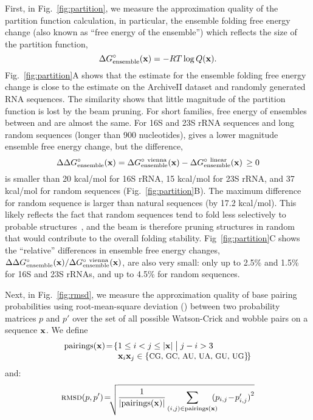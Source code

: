 First, in Fig.~\ref{fig:partition}, we measure the approximation quality of the partition function calculation,
in particular,  the ensemble folding free energy change (also known as ``free energy of the ensemble'')
which reflects the size of the partition function, 
\[
\Delta G^\circ_\text{ensemble} (\mathbf{x}) = -RT \log Q(\mathbf{x}).
\]
Fig.~\ref{fig:partition}A shows that the \linearpartition 
estimate for the ensemble folding free energy change
is close to the \rnafold estimate 
on the ArchiveII dataset and randomly generated RNA sequences.
The similarity shows that little magnitude of the partition function is lost by the beam pruning. 
For short families, free energy of ensembles between \linearpartition and \rnafold are almost the same.
For 16S and 23S rRNA sequences and long random sequences (longer than 900 nucleotides), 
\linearpartition gives a lower magnitude ensemble free energy change, 
but the difference,
\[
\Delta\Delta G^{\circ}_\text{ensemble}(\mathbf{x}) = \Delta G^{\circ\ \text{vienna}}_\text{ensemble}(\mathbf{x}) - \Delta G^{\circ\ \text{linear}}_\text{ensemble}(\mathbf{x}) \, \geq 0
\]
is smaller than 20 kcal/mol for 16S rRNA, 
15 kcal/mol for 23S rRNA,
and 37 kcal/mol for random sequences (Fig.~\ref{fig:partition}B). 
The maximum difference for random sequence is larger than natural sequences (by 17.2 kcal/mol).
This likely reflects the fact that random sequences tend to fold less selectively to probable structures~\cite{Fu+:2015},
and the beam is therefore pruning structures in random that would contribute to the overall folding stability.
Fig~\ref{fig:partition}C shows the ``relative'' differences in ensemble free energy changes,
 ${\Delta\Delta G^{\circ}_\text{ensemble}(\mathbf{x})}/{\Delta G^{\circ\ \text{vienna}}_\text{ensemble}(\mathbf{x})}$,
are also very small: only up to 2.5\% and 1.5\% for 16S and 23S rRNAs, and up to 4.5\% for random sequences.



Next, in Fig.~\ref{fig:rmsd}, we measure the approximation quality of base pairing probabilities using root-mean-square deviation (\RMSD)
between two probability matrices $p$ %
and $p'$ %
over the set of all possible Watson-Crick and wobble pairs on a sequence $\mathbf{x}$.
We  define
\begin{equation}
  \vspace{-0.4cm}
\begin{split}
  {\pairings}(\vecx) \!=\!\{  &1\leq i <j\leq |\vecx| \bigm\vert j-i>3 \\[-0.1cm]
    &  \vecx_i\vecx_j \in \{\text{\small CG, GC, AU, UA, GU, UG}\}\!\} \notag
\end{split}
\end{equation}
\vspace{-0.2cm}
and:\vspace{-0.05cm} 
\begin{equation}
\RMSD(p,p')\!=\!\!\!\sqrt{\frac{1}{|{\pairings}(\vecx)|} \sum_{(i,j) \in {{\pairings}(\vecx)}}{\!\!\!\!\!(p_{i,j}\!-\!p'_{i,j})}^2}\notag
\end{equation}

